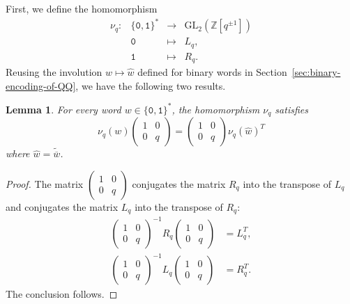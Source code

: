 \documentclass[a4paper,12pt]{amsart}
\newtheorem{lemma}[definition]{Lemma}
\newcommand{\Z}{\mathbb{Z}}
\newcommand{\GL}{\mathrm{GL}}
\newcommand{\0}{\mathtt{0}}
\newcommand{\1}{\mathtt{1}}
\newcommand{\2}{\mathtt{2}}
\newcommand{\3}{\mathtt{3}}
\begin{document}
First, we define the homomorphism
\[
    \begin{array}{rccl}
        \nu_q: &\{\0,\1\}^* &\to& \GL_2(\Z[q^{\pm1}])\\
        &\0 &\mapsto& L_q,\\
        &\1 &\mapsto& R_q.
    \end{array}
\]
Reusing the involution $w\mapsto \widehat{w}$
defined for binary words in Section~\ref{sec:binary-encoding-of-QQ},
we have the following two results.

\begin{lemma}\label{lem:identity-w-hat}
For every word $w\in\{\0,\1\}^*$,
the homomorphism $\nu_q$ satisfies
\begin{equation}\label{eq:nu_q_hat_property}
    \nu_q(w)
    \left(\begin{smallmatrix} 1 & 0 \\ 0 & q \end{smallmatrix}\right)
        =
    \left(\begin{smallmatrix} 1 & 0 \\ 0 & q \end{smallmatrix}\right)
        \nu_q(\widehat{w})^T
\end{equation}
where $\widehat{w}=\widetilde{\overline{w}}$.
\end{lemma}


\begin{proof}
    The matrix
    $\left(\begin{smallmatrix} 1 & 0 \\ 0 & q \end{smallmatrix}\right)$
    conjugates the matrix $R_q$ into the transpose of $L_q$
    and conjugates the matrix $L_q$ into the transpose of $R_q$:
\begin{align*}
    \left(\begin{smallmatrix} 1 & 0 \\ 0 & q \end{smallmatrix}\right)^{-1}
        R_q
    \left(\begin{smallmatrix} 1 & 0 \\ 0 & q \end{smallmatrix}\right)
        &= L_q^T,\\
    \left(\begin{smallmatrix} 1 & 0 \\ 0 & q \end{smallmatrix}\right)^{-1}
        L_q
    \left(\begin{smallmatrix} 1 & 0 \\ 0 & q \end{smallmatrix}\right)
        &= R_q^T.
\end{align*}
The conclusion follows.
\end{proof}
\end{document}
